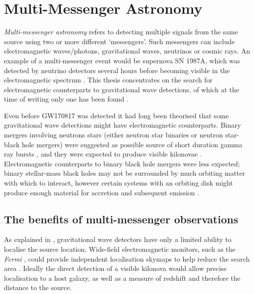 \section{Multi-Messenger Astronomy}
\label{sec:multi}
\begin{colsection}


\begin{colsection}

\emph{Multi-messenger astronomy} refers to detecting multiple signals from the same source using two or more different `messengers'. Such messengers can include electromagnetic waves/photons, gravitational waves, neutrinos or cosmic rays. An example of a multi-messenger event would be supernova SN 1987A, which was detected by neutrino detectors several hours before becoming visible in the electromagnetic spectrum \citep{SN1987A}. This thesis concentrates on the search for electromagnetic counterparts to gravitational wave detections, of which at the time of writing only one has been found \citep[GW170817;][]{GW170817}.

Even before GW170817 was detected it had long been theorised that some gravitational wave detections might have electromagnetic counterparts. Binary mergers involving neutrons stars (either neutron star binaries or neutron star-black hole mergers) were suggested as possible source of short duration gamma ray bursts \citep{SGRBs}, and they were expected to produce visible kilonovae \citep{BNSNSBH_EM, BNS_EM}. Electromagnetic counterparts to binary black hole mergers were less expected; binary stellar-mass black holes may not be surrounded by much orbiting matter with which to interact, however certain systems with an orbiting disk might produce enough material for accretion and subsequent emission \citep{BBH_EM}.

\end{colsection}


\subsection{The benefits of multi-messenger observations}
\label{sec:mma_benefits}
\begin{colsection}

As explained in , gravitational wave detectors have only a limited ability to localise the source location. Wide-field electromagnetic monitors, such as the \textit{Fermi} , could provide independent localisation skymaps to help reduce the search area \citep[note the \textit{Fermi} skymap included in ]{GW170817_GRB}. Ideally the direct detection of a visible kilonova would allow precise localisation to a host galaxy, as well as a measure of redshift and therefore the distance to the source.


\end{colsection}
\end{colsection}
